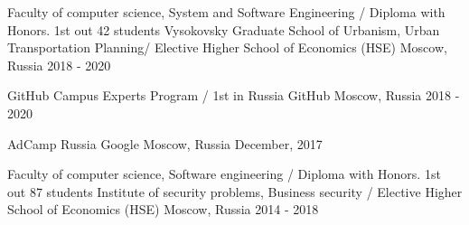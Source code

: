 

\cventryeducation
{Faculty of computer science, System and Software Engineering / Diploma with Honors. 1st out 42 students
		\newline Vysokovsky Graduate School of Urbanism, Urban Transportation Planning/ Elective} %
{Higher School of Economics (HSE)} %
{Moscow, Russia} %
{2018 - 2020} %

\cventryeducation
{GitHub Campus Experts Program / 1st in Russia} %
{GitHub} %
{Moscow, Russia} %
{2018 - 2020} %

\cventryeducation
{AdCamp Russia} %
{Google} %
{Moscow, Russia} %
{December, 2017} %

\cventryeducation
{Faculty of computer science, Software engineering / Diploma with Honors. 1st out 87 students
	\newline Institute of security problems, Business security / Elective} %
{Higher School of Economics (HSE)} %
{Moscow, Russia} %
{2014 - 2018} %




